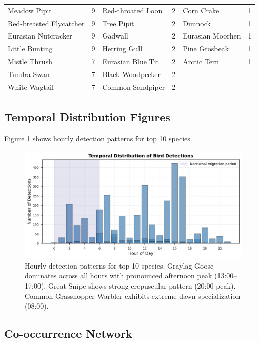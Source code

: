 \documentclass[twocolumn]{article}
\begin{document}
\begin{table}[H]
\begin{tabular}{lr|lr|lr}
Meadow Pipit & 9 & Red-throated Loon & 2 & Corn Crake & 1 \\
Red-breasted Flycatcher & 9 & Tree Pipit & 2 & Dunnock & 1 \\
Eurasian Nutcracker & 9 & Gadwall & 2 & Eurasian Moorhen & 1 \\
Little Bunting & 9 & Herring Gull & 2 & Pine Grosbeak & 1 \\
Mistle Thrush & 7 & Eurasian Blue Tit & 2 & Arctic Tern & 1 \\
Tundra Swan & 7 & Black Woodpecker & 2 &  &  \\
White Wagtail & 7 & Common Sandpiper & 2 &  &  \\
\bottomrule
\end{tabular}
\end{table}

\subsection{Temporal Distribution Figures}

Figure \ref{fig:temporal} shows hourly detection patterns for top 10 species.

\begin{figure}[H]
\centering
\includegraphics[width=\textwidth]{figures/temporal_distribution.png}
\caption{Hourly detection patterns for top 10 species. Graylag Goose dominates across all hours with pronounced afternoon peak (13:00--17:00). Great Snipe shows strong crepuscular pattern (20:00 peak). Common Grasshopper-Warbler exhibits extreme dawn specialization (08:00).}
\label{fig:temporal}
\end{figure}

\subsection{Co-occurrence Network}
\end{document}
